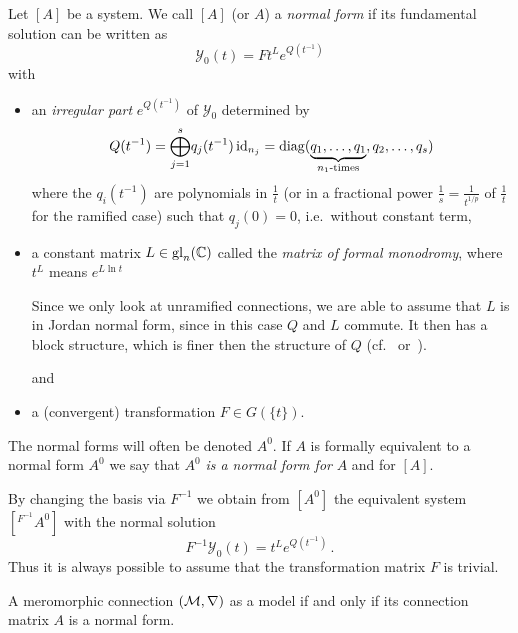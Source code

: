 \begin{defn}\label{defn:normSol}
  Let $[A]$ be a system.
  We call $[A]$ (or $A$) a \emph{normal form} if its fundamental solution can
  be written as
  \[
    \mathcal{Y}_0(t)=F t^L e^{Q(t^{-1})}
  \]
  with
  \begin{itemize}
    \item an \emph{irregular part} $e^{Q(t^{-1})}$ of $\mathcal{Y}_0$
      determined by
      \[
        Q(t^{-1})=\underset{j=1}{\overset{s}{\bigoplus}}q_j(t^{-1})\id_{n_j}
          =\diag(\underset{n_1\text{-times}}{\underbrace{%
          q_1,\dots,q_1}},q_2,\dots,q_s)
      \]
      where the $q_i(t^{-1})$ are polynomials in $\frac{1}{t}$ (or in a
      fractional power $\frac{1}{s}=\frac{1}{t^{1/p}}$ of $\frac{1}{t}$ for the
      ramified case) such that $q_j(0)=0$, i.e.\ without constant term,
    \item a constant matrix $L\in\operatorname{gl}_n(\mathbb{C})$ called the \emph{matrix of formal
      monodromy}, where $t^L$ means $e^{L\ln t}$
        \begin{s-rem}
          Since we only look at unramified connections, we are able to assume
          that $L$ is in Jordan normal form, since in this case $Q$ and $L$
          commute. It then has a block structure, which is finer then the
          structure of $Q$ (cf.~\cite{Remy2014} or~\cite[Sec.4]{Martinet1991}).
          \PROBLEM[Why?]
        \end{s-rem}
      and
    \item a (convergent) transformation $F\in G(\!\{t\}\!)$.
  \end{itemize}
  The normal forms will often be denoted $A^0$.
  If $A$ is formally equivalent to a normal form $A^0$ we say that $A^0$
  \emph{is a normal form for} $A$ and for $[A]$.

  \begin{s-rem}
    By changing the basis via $F^{-1}$ we obtain from $[A^0]$ the equivalent
    system $[{}^{F^{-1}}\!A^0]$ with the normal solution
    \[
      F^{-1}\mathcal{Y}_0(t)=t^L e^{Q(t^{-1})} \,.
    \]
    Thus it is always possible to assume that the transformation matrix $F$ is
    trivial.
  \end{s-rem}
\end{defn}
\begin{cor}
  A meromorphic connection $(\mathcal{M},\nabla)$ as a model if and only if its
  connection matrix $A$ is a normal form.
\end{cor}


